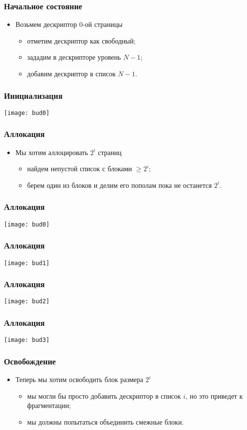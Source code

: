 \begin{frame}
\frametitle{Начальное состояние}
\begin{itemize}
    \item<1->Возьмем дескриптор $0$-ой страницы
    \begin{itemize}
        \item<2->отметим дескриптор как свободный;
        \item<3->зададим в дескрипторе уровень $N-1$;
        \item<4->добавим дескриптор в список $N-1$.
    \end{itemize}
\end{itemize}
\end{frame}

\begin{frame}
\frametitle{Инициализация}
\texttt{[image: bud0]}
\end{frame}

\begin{frame}
\frametitle{Аллокация}
\begin{itemize}
    \item<1->Мы хотим аллоцировать $2^i$ страниц
    \begin{itemize}
        \item<2->найдем непустой список с блоками $\ge 2^i$;
        \item<3->берем один из блоков и делим его пополам пока не останется
        $2^i$.
    \end{itemize}
\end{itemize}
\end{frame}

\begin{frame}
\frametitle{Аллокация}
\texttt{[image: bud0]}
\end{frame}

\begin{frame}
\frametitle{Аллокация}
\texttt{[image: bud1]}
\end{frame}

\begin{frame}
\frametitle{Аллокация}
\texttt{[image: bud2]}
\end{frame}

\begin{frame}
\frametitle{Аллокация}
\texttt{[image: bud3]}
\end{frame}

\begin{frame}
\frametitle{Освобождение}
\begin{itemize}
    \item<1->Теперь мы хотим освободить блок размера $2^i$
    \begin{itemize}
        \item<2->мы могли бы просто добавить дескриптор в список $i$, но это
        приведет к фрагментации;
        \item<3->мы должны попытаться объединить смежные блоки.
    \end{itemize}
\end{itemize}
\end{frame}

